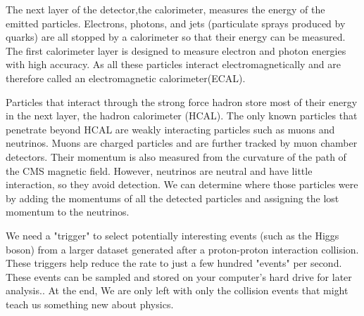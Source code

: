 The  next layer of the detector,the calorimeter, measures the energy of the emitted particles. Electrons, photons, and jets (particulate sprays produced by quarks) are all  stopped by a calorimeter so that their energy can be measured. The first calorimeter layer is designed to measure electron and photon energies  with high accuracy. As all these particles interact electromagnetically and are therefore called an electromagnetic calorimeter(ECAL)\cite{CMS_4}.

Particles that interact through the strong force hadron store most of their energy in the next layer, the hadron calorimeter (HCAL). The only known particles that penetrate beyond  HCAL are  weakly interacting particles such as muons and neutrinos. Muons are charged particles and are further tracked by muon chamber detectors. Their momentum is also measured from the curvature of the path of the CMS magnetic field. However, neutrinos are neutral and have little interaction, so they avoid detection. We can determine where those particles were by adding  the momentums of all the detected particles and assigning the lost momentum to the neutrinos.

We need a "trigger" to select  potentially interesting events (such as the Higgs boson) from a larger dataset generated after a proton-proton interaction collision. These triggers help reduce the rate to just a few hundred "events" per second. These events can be sampled and stored on your computer's hard drive for later analysis.\cite{CMS_5}. At the end, We are only left with only the collision events that might teach us something new about physics.

